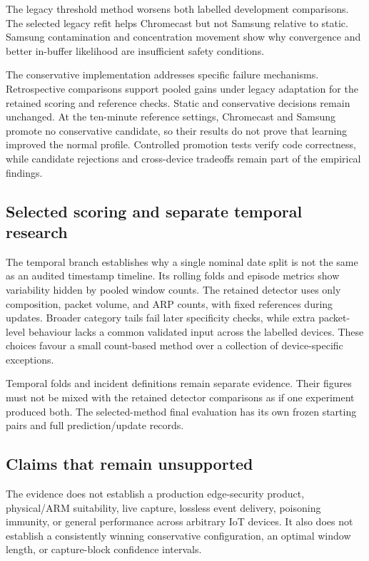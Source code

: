 The legacy threshold method worsens both labelled development comparisons.
The selected legacy refit helps Chromecast but not Samsung relative to static.
Samsung contamination and concentration movement show why convergence and
better in-buffer likelihood are insufficient safety conditions.

The conservative implementation addresses specific failure mechanisms.
Retrospective comparisons support pooled gains under legacy adaptation for the
retained scoring and reference checks. Static and conservative decisions remain
unchanged. At the ten-minute reference settings, Chromecast and Samsung promote
no conservative candidate, so their results do not prove that learning improved
the normal profile. Controlled promotion tests verify
code correctness, while candidate rejections and cross-device tradeoffs remain
part of the empirical findings.

\subsection{Selected scoring and separate temporal research}

The temporal branch establishes why a single nominal date split is not the
same as an audited timestamp timeline. Its rolling folds and episode metrics
show variability hidden by pooled window counts. The retained detector uses
only composition, packet volume, and ARP counts, with fixed references during
updates. Broader category tails fail later specificity checks, while extra
packet-level behaviour lacks a common validated input across the labelled
devices. These choices favour a small count-based method over a collection of
device-specific exceptions.

Temporal folds and incident definitions remain separate evidence. Their
figures must not be mixed with the retained detector comparisons as if one
experiment produced both. The selected-method final evaluation has its own
frozen starting pairs and full prediction/update records.

\subsection{Claims that remain unsupported}

The evidence does not establish a production edge-security product,
physical/ARM suitability, live capture, lossless event delivery, poisoning
immunity, or general performance across arbitrary IoT devices. It also does
not establish a consistently winning conservative configuration, an optimal
window length, or capture-block confidence intervals.

